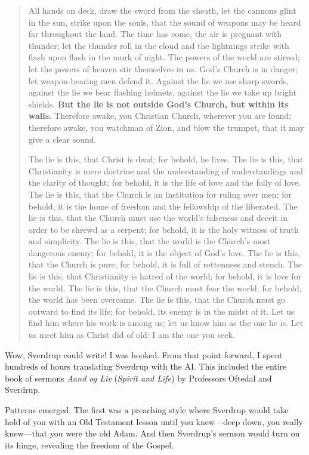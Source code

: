 \begin{quote}
All hands on deck, draw the sword from the sheath, let the cannons glint in the sun, strike upon the souls, that the sound of weapons may be heard far throughout the land. The time has come, the air is pregnant with thunder; let the thunder roll in the cloud and the lightnings strike with flash upon flash in the murk of night. The powers of the world are stirred; let the powers of heaven stir themselves in us. God’s Church is in danger; let weapon-bearing men defend it. Against the lie we use sharp swords, against the lie we bear flashing helmets, against the lie we take up bright shields. \textbf{But the lie is not outside God’s Church, but within its walls.} Therefore awake, you Christian Church, wherever you are found; therefore awake, you watchman of Zion, and blow the trumpet, that it may give a clear sound.

The lie is this, that Christ is dead; for behold, he lives. The lie is this, that Christianity is mere doctrine and the understanding of understandings and the clarity of thought; for behold, it is the life of love and the folly of love. The lie is this, that the Church is an institution for ruling over men; for behold, it is the home of freedom and the fellowship of the liberated. The lie is this, that the Church must use the world’s falseness and deceit in order to be shrewd as a serpent; for behold, it is the holy witness of truth and simplicity. The lie is this, that the world is the Church’s most dangerous enemy; for behold, it is the object of God’s love. The lie is this, that the Church is pure; for behold, it is full of rottenness and stench. The lie is this, that Christianity is hatred of the world; for behold, it is love for the world. The lie is this, that the Church must fear the world; for behold, the world has been overcome. The lie is this, that the Church must go outward to find its life; for behold, its enemy is in the midst of it. Let us find him where his work is among us; let us know him as the one he is. Let us meet him as Christ did of old: I am the one you seek.

\end{quote}

Wow, Sverdrup could write! I was hooked. From that point forward, I spent hundreds of hours translating Sverdrup with the AI. This included the entire book of sermons \textit{Aand og Liv} (\textit{Spirit and Life}) by Professors Oftedal and Sverdrup.

Patterns emerged. The first was a preaching style where Sverdrup would take hold of you with an Old Testament lesson until you knew---deep down, you really knew---that you were the old Adam. And then Sverdrup's sermon would turn on its hinge, revealing the freedom of the Gospel.

